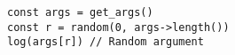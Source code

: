 \vspace{-2.25em}
\begin{center}
\begin{minipage}[t]{1\textwidth}
\begin{listing}[H]
\begin{spacing}{0.6}
\begin{verbatim}
const args = get_args()
const r = random(0, args->length())
log(args[r]) // Random argument
\end{verbatim}
\end{spacing}
\end{listing}
\end{minipage}
\end{center}
